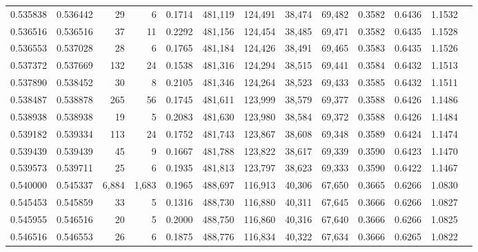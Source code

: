 \begin{tabular}{rrrrrrrrrrrrr}
0.535838 & 0.536442 &     29 &     6 &                                     0.1714 & 481,119 & 124,491 &  38,474 &  69,482 & 0.3582 & 0.6436 & 1.1532 \\
0.536516 & 0.536516 &     37 &    11 &                                     0.2292 & 481,156 & 124,454 &  38,485 &  69,471 & 0.3582 & 0.6435 & 1.1528 \\
0.536553 & 0.537028 &     28 &     6 &                                     0.1765 & 481,184 & 124,426 &  38,491 &  69,465 & 0.3583 & 0.6435 & 1.1526 \\
0.537372 & 0.537669 &    132 &    24 &                                     0.1538 & 481,316 & 124,294 &  38,515 &  69,441 & 0.3584 & 0.6432 & 1.1513 \\
0.537890 & 0.538452 &     30 &     8 &                                     0.2105 & 481,346 & 124,264 &  38,523 &  69,433 & 0.3585 & 0.6432 & 1.1511 \\
0.538487 & 0.538878 &    265 &    56 &                                     0.1745 & 481,611 & 123,999 &  38,579 &  69,377 & 0.3588 & 0.6426 & 1.1486 \\
0.538938 & 0.538938 &     19 &     5 &                                     0.2083 & 481,630 & 123,980 &  38,584 &  69,372 & 0.3588 & 0.6426 & 1.1484 \\
0.539182 & 0.539334 &    113 &    24 &                                     0.1752 & 481,743 & 123,867 &  38,608 &  69,348 & 0.3589 & 0.6424 & 1.1474 \\
0.539439 & 0.539439 &     45 &     9 &                                     0.1667 & 481,788 & 123,822 &  38,617 &  69,339 & 0.3590 & 0.6423 & 1.1470 \\
0.539573 & 0.539711 &     25 &     6 &                                     0.1935 & 481,813 & 123,797 &  38,623 &  69,333 & 0.3590 & 0.6422 & 1.1467 \\
0.540000 & 0.545337 &  6,884 & 1,683 &                                     0.1965 & 488,697 & 116,913 &  40,306 &  67,650 & 0.3665 & 0.6266 & 1.0830 \\
0.545453 & 0.545859 &     33 &     5 &                                     0.1316 & 488,730 & 116,880 &  40,311 &  67,645 & 0.3666 & 0.6266 & 1.0827 \\
0.545955 & 0.546516 &     20 &     5 &                                     0.2000 & 488,750 & 116,860 &  40,316 &  67,640 & 0.3666 & 0.6266 & 1.0825 \\
0.546516 & 0.546553 &     26 &     6 &                                     0.1875 & 488,776 & 116,834 &  40,322 &  67,634 & 0.3666 & 0.6265 & 1.0822 \\

\end{tabular}
